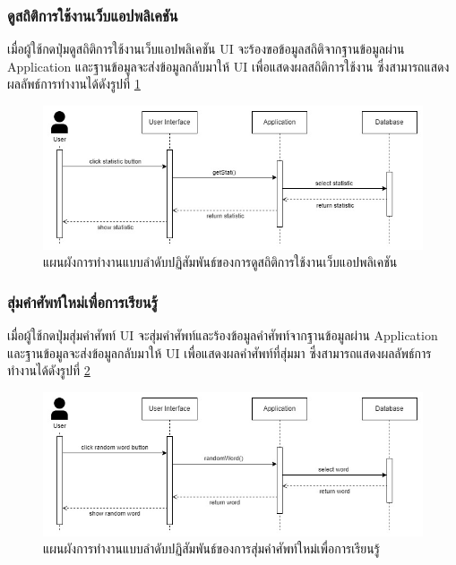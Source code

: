 \documentclass[12pt,oneside,openright,a4paper]{cpe-thai-project}
\begin{document}
\pagebreak
\subsubsection{ดูสถิติการใช้งานเว็บแอปพลิเคชัน}
\hspace{1cm}
เมื่อผู้ใช้กดปุ่มดูสถิติการใช้งานเว็บแอปพลิเคชัน UI จะร้องขอข้อมูลสถิติจากฐานข้อมูลผ่าน Application
และฐานข้อมูลจะส่งข้อมูลกลับมาให้ UI เพื่อแสดงผลสถิติการใช้งาน ซึ่งสามารถแสดงผลลัพธ์การทำงานได้ดังรูปที่ \ref{fig:S_Statistic}
\begin{figure}[!h]\centering
	\includegraphics[width=\textwidth, keepaspectratio=true]{image/chap3/sequence/Statistic.jpg}
	\caption{แผนผังการทำงานแบบลำดับปฏิสัมพันธ์ของการดูสถิติการใช้งานเว็บแอปพลิเคชัน}\label{fig:S_Statistic}
\end{figure}

\subsubsection{สุ่มคำศัพท์ใหม่เพื่อการเรียนรู้}
\hspace{1cm}
เมื่อผู้ใช้กดปุ่มสุ่มคำศัพท์ UI จะสุ่มคำศัพท์และร้องข้อมูลคำศัพท์จากฐานข้อมูลผ่าน Application
และฐานข้อมูลจะส่งข้อมูลกลับมาให้ UI เพื่อแสดงผลคำศัพท์ที่สุ่มมา ซึ่งสามารถแสดงผลลัพธ์การทำงานได้ดังรูปที่ \ref{fig:S_RandomWord}
\begin{figure}[!h]\centering
	\includegraphics[width=\textwidth, keepaspectratio=true]{image/chap3/sequence/Random word.jpg}
	\caption{แผนผังการทำงานแบบลำดับปฏิสัมพันธ์ของการสุ่มคำศัพท์ใหม่เพื่อการเรียนรู้}\label{fig:S_RandomWord}
\end{figure}
\end{document}
